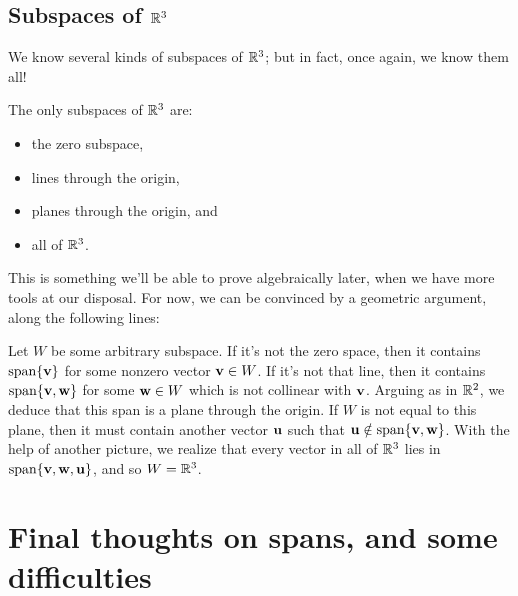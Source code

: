 
\subsection{Subspaces of $\R^3$}
We know several kinds of subspaces of $\R^3$; but in fact, once again,
we know them all!

\begin{theorem}[Subspaces of $\R^3$]
The only subspaces of $\R^3$ are:
\begin{itemize}
\item the zero subspace,
\item lines through the origin,
\item planes through the origin, and
\item all of $\R^3$.
\end{itemize}
\end{theorem}

This is something we'll be able to prove algebraically later, when
we have more tools at our disposal.  For now, we can be convinced
by a geometric argument, along the following lines:

Let $W$ be some arbitrary subspace.  If it's not the zero space,
then it contains $\textrm{span}\{\mathbf{v}\}$ for some nonzero vector $\mathbf{v} \in W$.
If it's not that line, then it contains $\textrm{span}\{\mathbf{v},\mathbf{w}\}$ for
some $\mathbf{w}\in W$ which is not collinear with $\mathbf{v}$.  Arguing as
in $\mathbb{R}^2$, we deduce that this span is a plane through the origin.
If $W$ is not equal to this plane, then it must contain another
vector $\mathbf{u}$ such that $\mathbf{u} \notin \textrm{span}\{\mathbf{v},\mathbf{w}\}$.  With
the help of another picture, we realize that every vector in
all of $\R^3$ lies in $\textrm{span}\{\mathbf{v},\mathbf{w},\mathbf{u}\}$, and so $W = \mathbb{R}^3$.

\section{Final thoughts on spans, and some difficulties}

